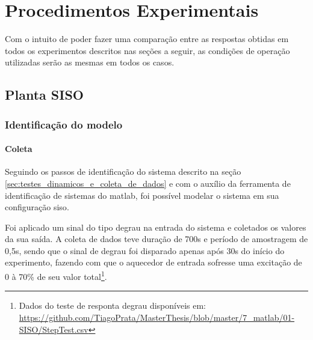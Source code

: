 \chapter{Procedimentos Experimentais}
\label{ch:procedimentos_experimentais}

Com o intuito de poder fazer uma comparação entre as respostas obtidas em todos os experimentos
descritos nas seções a seguir, as condições de operação utilizadas serão as mesmas em todos
os casos.

\section{Planta SISO}
\label{sec:planta_siso}

\subsection{Identificação do modelo}
\label{subsec:siso_identificacao_do_modelo}

\subsubsection{Coleta}
\label{subsubsec:siso_identificacao_do_modelo_coleta}

Seguindo os passos de identificação do sistema descrito na seção \ref{sec:testes_dinamicos_e_coleta_de_dados}
e com o auxílio da ferramenta de identificação de sistemas do \acrshort{matlab}, foi possível modelar
o sistema em sua configuração \acrshort{siso}.

Foi aplicado um sinal do tipo degrau na entrada do sistema e coletados os valores da sua saída.
A coleta de dados teve duração de 700s e período de amostragem de 0,5s, sendo que o sinal de
degrau foi disparado apenas após 30s do início do experimento, fazendo com que o aquecedor de
entrada sofresse uma excitação de 0 à 70\% de seu valor total\footnote{
	Dados do teste de responta degrau disponíveis em:
	\url{https://github.com/TiagoPrata/MasterThesis/blob/master/7_matlab/01-SISO/StepTest.csv}
}.

